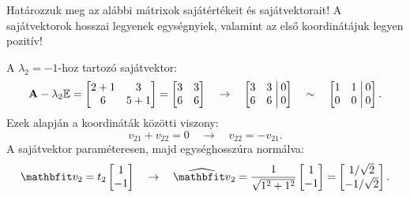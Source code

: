 \documentclass[exercise]{math-standalone}
\begin{document}
\begin{exercise}{%
    Határozzuk meg az alábbi mátrixok sajátértékeit és sajátvektorait!
    A sajátvektorok hosszai legyenek egységnyiek, valamint az első koordinátájuk
    legyen pozitív!
  }
{  A $\lambda_2 = -1$-hoz tartozó sajátvektor:
  \[
    \mathbf{A} - \lambda_2 {\mathbb{E}} = \begin{bmatrix}
      2 + 1 & 3     \\
      6     & 5 + 1
    \end{bmatrix} = \begin{bmatrix}
      3 & 3 \\
      6 & 6
    \end{bmatrix}
    \quad \rightarrow \quad
    \left[\begin{matrix}
        3 & 3 \\
        6 & 6
      \end{matrix}\right.\left|\begin{matrix}
        \,0 \\ \,0
      \end{matrix}\right]
    \quad \sim \quad
    \left[\begin{matrix}
        1 & 1 \\
        0 & 0
      \end{matrix}\right.\left|\begin{matrix}
        \,0 \\ \,0
      \end{matrix}\right]
    \text{.}
  \]
  Ezek alapján a koordináták közötti viszony:
  \[
    v_{21} + v_{22} = 0
    \quad \rightarrow \quad
    v_{22} = -v_{21}
    \text{.}
  \]
  A sajátvektor paraméteresen, majd egységhosszúra normálva:
  \[
    \rvec v_2 = t_2 \begin{bmatrix}
      1 \\ -1
    \end{bmatrix}
    \quad
    \rightarrow
    \quad
    \uvec v_2 = \frac{1}{\sqrt{1^2 + 1^2}}\begin{bmatrix}
      1 \\ -1
    \end{bmatrix} = \begin{bmatrix}
      1 / \sqrt{2} \\
      -1 / \sqrt{2}
    \end{bmatrix}
    \text{.}
  \]

  \tcbline

}
\end{exercise}
\end{document}
